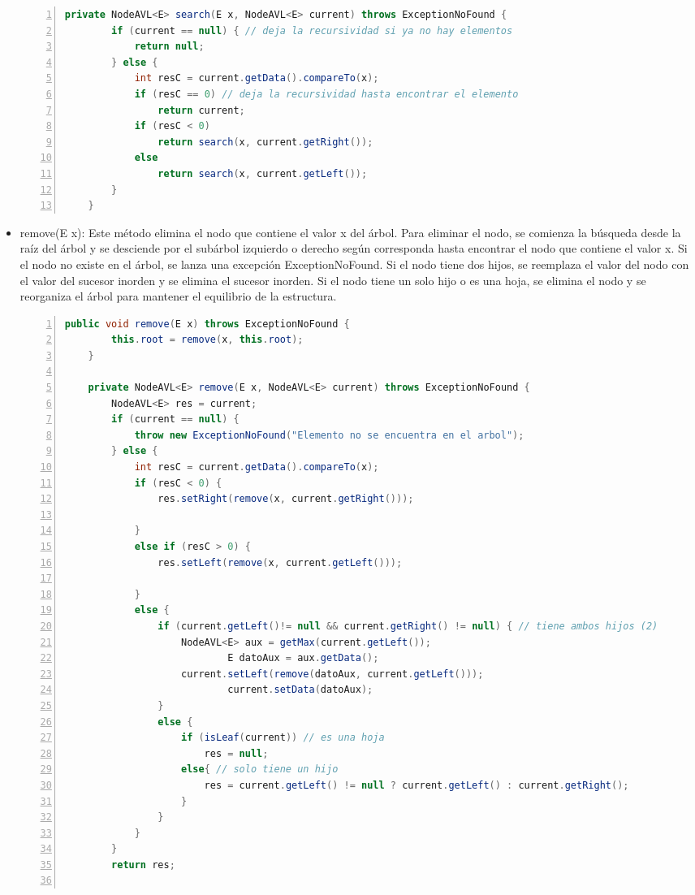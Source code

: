 \documentclass{article}
\begin{document}
\begin{itemize}
\begin{lstlisting}[language=Java, caption=Método search(E x), numbers=left]
    private NodeAVL<E> search(E x, NodeAVL<E> current) throws ExceptionNoFound {
        if (current == null) { // deja la recursividad si ya no hay elementos
            return null;
        } else {
            int resC = current.getData().compareTo(x);
            if (resC == 0) // deja la recursividad hasta encontrar el elemento
                return current;
            if (resC < 0)
                return search(x, current.getRight());
            else
                return search(x, current.getLeft());
        }
    }
                            \end{lstlisting}
                    \item remove(E x): Este método elimina el nodo que contiene el valor x del árbol. Para eliminar el nodo, se comienza la búsqueda desde la raíz del árbol y se desciende por el subárbol izquierdo o derecho según corresponda hasta encontrar el nodo que contiene el valor x. Si el nodo no existe en el árbol, se lanza una excepción ExceptionNoFound. Si el nodo tiene dos hijos, se reemplaza el valor del nodo con el valor del sucesor inorden y se elimina el sucesor inorden. Si el nodo tiene un solo hijo o es una hoja, se elimina el nodo y se reorganiza el árbol para mantener el equilibrio de la estructura.
                            \begin{lstlisting}[language=Java, caption=Método remove(E x), numbers=left]
    public void remove(E x) throws ExceptionNoFound {
        this.root = remove(x, this.root);
    }
    
    private NodeAVL<E> remove(E x, NodeAVL<E> current) throws ExceptionNoFound {
        NodeAVL<E> res = current;
        if (current == null) {
            throw new ExceptionNoFound("Elemento no se encuentra en el arbol");
        } else {
            int resC = current.getData().compareTo(x);
            if (resC < 0) {
                res.setRight(remove(x, current.getRight()));
    
            }
            else if (resC > 0) {
                res.setLeft(remove(x, current.getLeft()));
    
            }
            else {
                if (current.getLeft()!= null && current.getRight() != null) { // tiene ambos hijos (2)
                    NodeAVL<E> aux = getMax(current.getLeft());
                            E datoAux = aux.getData();
                    current.setLeft(remove(datoAux, current.getLeft()));
                            current.setData(datoAux);
                }
                else {
                    if (isLeaf(current)) // es una hoja
                        res = null;
                    else{ // solo tiene un hijo
                        res = current.getLeft() != null ? current.getLeft() : current.getRight();
                    } 
                }
            }
        }
        return res;
    

\end{lstlisting}
\end{itemize}
\end{document}
